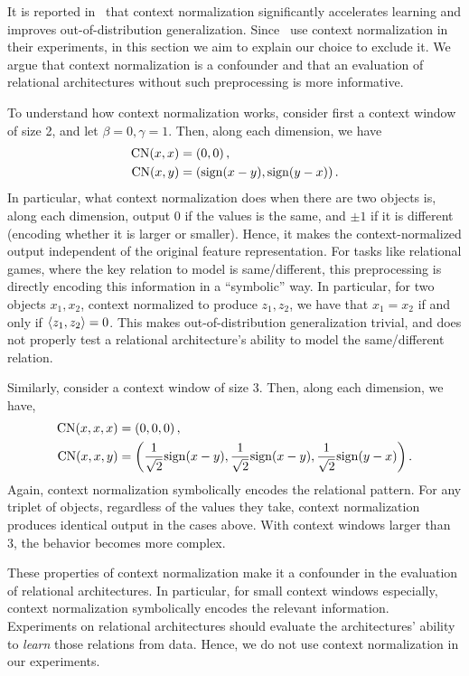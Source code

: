 It is reported in~\citep{webbEmergentSymbols2021,kergNeuralArchitecture2022} that context normalization significantly accelerates learning and improves out-of-distribution generalization. Since~\citep{webbEmergentSymbols2021,kergNeuralArchitecture2022} use context normalization in their experiments, in this section we aim to explain our choice to exclude it. We argue that context normalization is a confounder and that an evaluation of relational architectures without such preprocessing is more informative.

To understand how context normalization works, consider first a context window of size 2, and let $\beta = 0, \gamma = 1$. Then, along each dimension, we have
\begin{align*}
        \mathrm{CN}(x, x) &= \paren{0, 0},\\
        \mathrm{CN}(x, y) &= \paren{\mathrm{sign}(x - y), \mathrm{sign}(y - x)}.
\end{align*}
In particular, what context normalization does when there are two objects is, along each dimension, output 0 if the values is the same, and $\pm 1$ if it is different (encoding whether it is larger or smaller). Hence, it makes the context-normalized output independent of the original feature representation. For tasks like relational games, where the key relation to model is same/different, this preprocessing is directly encoding this information in a ``symbolic'' way. In particular, for two objects $x_1, x_2$, context normalized to produce $z_1, z_2$, we have that $x_1 = x_2$ if and only if $\left \langle z_1, z_2 \right\rangle = 0$. This makes out-of-distribution generalization trivial, and does not properly test a relational architecture's ability to model the same/different relation.

Similarly, consider a context window of size 3. Then, along each dimension, we have,
\begin{align*}
        \mathrm{CN}(x, x, x) &= \paren{0, 0, 0},\\
        \mathrm{CN}(x, x, y) &= \paren{\frac{1}{\sqrt{2}} \mathrm{sign}(x - y), \frac{1}{\sqrt{2}} \mathrm{sign}(x - y), \frac{1}{\sqrt{2}} \mathrm{sign}(y - x)}.
\end{align*}
Again, context normalization symbolically encodes the relational pattern. For any triplet of objects, regardless of the values they take, context normalization produces identical output in the cases above. With context windows larger than 3, the behavior becomes more complex.

These properties of context normalization make it a confounder in the evaluation of relational architectures. In particular, for small context windows especially, context normalization symbolically encodes the relevant information. Experiments on relational architectures should evaluate the architectures' ability to \textit{learn} those relations from data. Hence, we do not use context normalization in our experiments.
